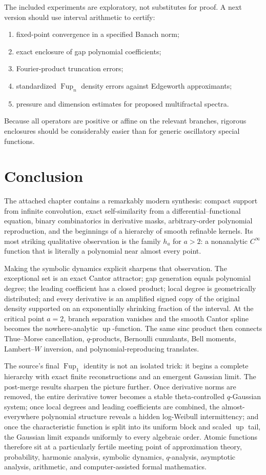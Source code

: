 \documentclass[11pt,oneside]{article}
\theoremstyle{definition}
\theoremstyle{remark}
\newcommand{\Up}{\operatorname{up}}
\newcommand{\Fup}{\operatorname{Fup}}
\begin{document}
The included experiments are exploratory, not substitutes for proof.  A next version should use interval arithmetic to certify:
\begin{enumerate}
  \item fixed-point convergence in a specified Banach norm;
  \item exact enclosure of gap polynomial coefficients;
  \item Fourier-product truncation errors;
  \item standardized \(\Fup_n\) density errors against Edgeworth approximants;
  \item pressure and dimension estimates for proposed multifractal spectra.
\end{enumerate}
Because all operators are positive or affine on the relevant branches, rigorous enclosures should be considerably easier than for generic oscillatory special functions.

\section{Conclusion}

The attached chapter contains a remarkably modern synthesis: compact support from infinite convolution, exact self-similarity from a differential--functional equation, binary combinatorics in derivative masks, arbitrary-order polynomial reproduction, and the beginnings of a hierarchy of smooth refinable kernels.  Its most striking qualitative observation is the family \(h_a\) for \(a>2\): a nonanalytic \(C^\infty\) function that is literally a polynomial near almost every point.

Making the symbolic dynamics explicit sharpens that observation.  The exceptional set is an exact Cantor attractor; gap generation equals polynomial degree; the leading coefficient has a closed product; local degree is geometrically distributed; and every derivative is an amplified signed copy of the original density supported on an exponentially shrinking fraction of the interval.  At the critical point \(a=2\), branch separation vanishes and the smooth Cantor spline becomes the nowhere-analytic \(\Up\)-function.  The same sinc product then connects Thue--Morse cancellation, \(q\)-products, Bernoulli cumulants, Bell moments, Lambert--\(W\) inversion, and polynomial-reproducing translates.

The source's final \(\Fup_1\) identity is not an isolated trick: it begins a complete hierarchy with exact finite reconstructions and an emergent Gaussian limit.  The post-merge results sharpen the picture further.  Once derivative norms are removed, the entire derivative tower becomes a stable theta-controlled \(q\)-Gaussian system; once local degrees and leading coefficients are combined, the almost-everywhere polynomial structure reveals a hidden log-Weibull intermittency; and once the characteristic function is split into its uniform block and scaled \(\Up\) tail, the Gaussian limit expands uniformly to every algebraic order.  Atomic functions therefore sit at a particularly fertile meeting point of approximation theory, probability, harmonic analysis, symbolic dynamics, \(q\)-analysis, asymptotic analysis, arithmetic, and computer-assisted formal mathematics.
\end{document}

